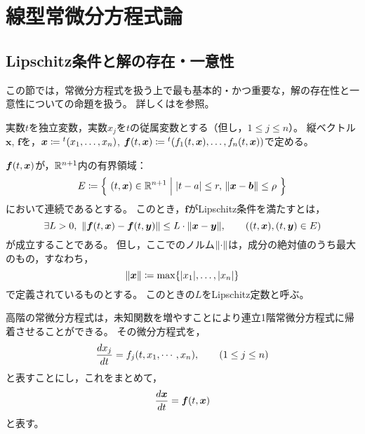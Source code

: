 \documentclass[a4paper,draft]{ltjsarticle}
\begin{document}
\section{線型常微分方程式論}
\subsection{Lipschitz条件と解の存在・一意性}
この節では，常微分方程式を扱う上で最も基本的・かつ重要な，解の存在性と一意性についての命題を扱う。
詳しくは\cite[高野]{takano}を参照。

実数$t$を独立変数，実数$x_j$を$t$の従属変数とする（但し，$1\leq j\leq n$）。
縦ベクトル$\bm{x}$, $\bm{f}$を，$\bm{x}\coloneqq \trans{\pare{x_1,\dots,x_n}}$, $\fun{\bm{f}}{t,\bm{x}}\coloneqq \trans{\pare{\fun{f_1}{t,\bm{x}},\dots,\fun{f_n}{t,\bm{x}}}}$で定める。

\begin{defi}[Lipschitz条件]
    $\fun{\bm{f}}{t,\bm{x}}$が，$\mathbb{R}^{n+1}$内の有界領域：
    \begin{equation}
        E\coloneqq \set{\pare{t,\bm{x}}\in\R^{n+1}}{\abs{t-a}\leq r,\,\norm{\bm{x}-\bm{b}}\leq \rho}
    \end{equation}
    において連続であるとする。
    このとき，$\bm{f}$がLipschitz条件を満たすとは，
    \begin{equation}
        \exists L>0,\ \norm{\fun{\bm{f}}{t,\bm{x}}-\fun{\bm{f}}{t,\bm{y}}}\leq L\cdot\norm{\bm{x}-\bm{y}},\quad\quad\pare{\pare{t,\bm{x}},\pare{t,\bm{y}}\in E}
    \end{equation}
    が成立することである。
    但し，ここでのノルム$\norm{\cdot}$は，成分の絶対値のうち最大のもの，すなわち，
    \begin{equation}
        \norm{\bm{x}}\coloneqq \max\bra{\abs{x_1},\dots,\abs{x_n}}
    \end{equation}
    で定義されているものとする。
    このときの$L$をLipschitz定数と呼ぶ。
\end{defi}

高階の常微分方程式は，未知関数を増やすことにより連立1階常微分方程式に帰着させることができる。
その微分方程式を，
\begin{equation}
    \diff{x_j}{t}=\fun{f_j}{t,x_1,\cdots,x_n},\quad\quad\pare{1\leq j\leq n}
\end{equation}
と表すことにし，これをまとめて，
\begin{equation}
    \label{eq:principle ODE}
    \diff{\bm{x}}{t}=\fun{\bm{f}}{t,\bm{x}}
\end{equation}
と表す。
\end{document}

